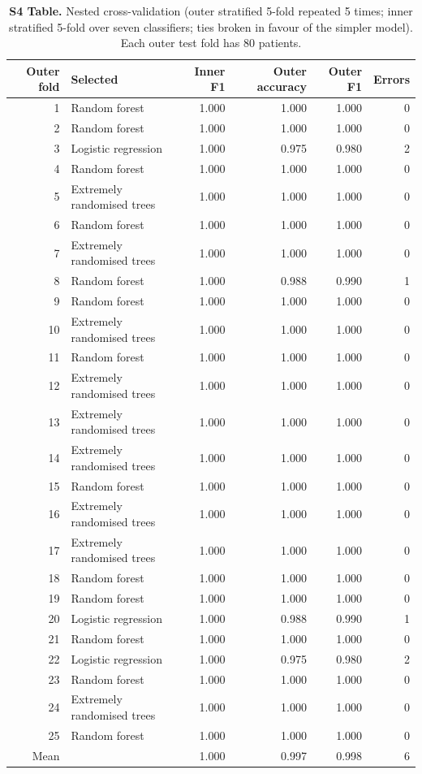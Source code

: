 \begin{table}[!ht]\centering\small
\caption{{\bf S4 Table.} Nested cross-validation (outer stratified 5-fold repeated 5 times; inner stratified 5-fold over seven classifiers; ties broken in favour of the simpler model). Each outer test fold has 80 patients.}
\begin{tabular}{rlrrrr}\toprule
Outer fold & Selected & Inner F1 & Outer accuracy & Outer F1 & Errors\\\midrule
1 & Random forest & 1.000 & 1.000 & 1.000 & 0\\
2 & Random forest & 1.000 & 1.000 & 1.000 & 0\\
3 & Logistic regression & 1.000 & 0.975 & 0.980 & 2\\
4 & Random forest & 1.000 & 1.000 & 1.000 & 0\\
5 & Extremely randomised trees & 1.000 & 1.000 & 1.000 & 0\\
6 & Random forest & 1.000 & 1.000 & 1.000 & 0\\
7 & Extremely randomised trees & 1.000 & 1.000 & 1.000 & 0\\
8 & Random forest & 1.000 & 0.988 & 0.990 & 1\\
9 & Random forest & 1.000 & 1.000 & 1.000 & 0\\
10 & Extremely randomised trees & 1.000 & 1.000 & 1.000 & 0\\
11 & Random forest & 1.000 & 1.000 & 1.000 & 0\\
12 & Extremely randomised trees & 1.000 & 1.000 & 1.000 & 0\\
13 & Extremely randomised trees & 1.000 & 1.000 & 1.000 & 0\\
14 & Extremely randomised trees & 1.000 & 1.000 & 1.000 & 0\\
15 & Random forest & 1.000 & 1.000 & 1.000 & 0\\
16 & Extremely randomised trees & 1.000 & 1.000 & 1.000 & 0\\
17 & Extremely randomised trees & 1.000 & 1.000 & 1.000 & 0\\
18 & Random forest & 1.000 & 1.000 & 1.000 & 0\\
19 & Random forest & 1.000 & 1.000 & 1.000 & 0\\
20 & Logistic regression & 1.000 & 0.988 & 0.990 & 1\\
21 & Random forest & 1.000 & 1.000 & 1.000 & 0\\
22 & Logistic regression & 1.000 & 0.975 & 0.980 & 2\\
23 & Random forest & 1.000 & 1.000 & 1.000 & 0\\
24 & Extremely randomised trees & 1.000 & 1.000 & 1.000 & 0\\
25 & Random forest & 1.000 & 1.000 & 1.000 & 0\\
\midrule Mean &  & 1.000 & 0.997 & 0.998 & 6\\
\bottomrule\end{tabular}\end{table}

